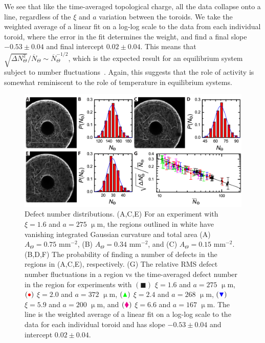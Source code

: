 We see that like the time-averaged topological charge, all the data collapse onto a line, regardless of the $\xi$ and $a$ variation between the toroids.
We take the weighted average of a linear fit on a log-log scale to the data from each individual toroid, where the error in the fit determines the weight, and find a final slope $-0.53 \pm 0.04$ and final intercept $0.02 \pm 0.04$.
This means that $\displaystyle{\sqrt{\Delta N_{\Theta}^2}} \bigg / \displaystyle {\overbar{N}_{\Theta}} \sim \overbar{N}_{\Theta}^{-1/2}$, which is the expected result for an equilibrium system subject to number fluctuations~\cite{RN311, gaussianApprox}.
Again, this suggests that the role of activity is somewhat reminiscent to the role of temperature in equilibrium systems.
\begin{figure}
  \centering
  \includegraphics{figures/C3/Ch3-Figs_ExpDistribution.png}
  \caption{Defect number distributions.
  (A,C,E) For an experiment with $\xi = 1.6$ and $a = 275$ $\upmu$m, the regions outlined in white have vanishing integrated Gaussian curvature and total area (A) $A_{\Theta} = 0.75$ mm$^{-2}$, (B) $A_{\Theta} = 0.34$ mm$^{-2}$, and (C) $A_{\Theta} = 0.15$ mm$^{-2}$.
  (B,D,F) The probability of finding a number of defects in the regions in (A,C,E), respectively.
  (G) The relative RMS defect number fluctuations in a region vs the time-averaged defect number in the region for experiments with
  $({\blacksquare})$ $\xi = 1.6 $ and $a = 275$ $\upmu$m,
  $({\color{red} \bullet})$ $\xi = 2.0 $ and $a = 372$ $\upmu$m,
  $({\color{green} \blacktriangle})$ $\xi = 2.4 $ and $a = 268$ $\upmu$m,
  $({\color{blue} \blacktriangledown})$ $\xi = 5.9$ and $a = 200$ $\upmu$m, and
  $({\color{magenta} \blacklozenge})$ $\xi = 6.6$ and $a = 167$ $\upmu$m.
  The line is the weighted average of a linear fit on a log-log scale to the data for each individual toroid and has slope $-0.53 \pm 0.04$ and intercept $0.02 \pm 0.04$.}\label{f:3-ExpDistribution}
\end{figure}



